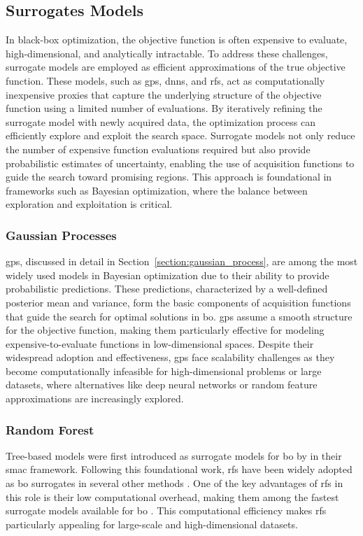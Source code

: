  
\subsection{Surrogates Models}
In black-box optimization, the objective function is often expensive to evaluate, high-dimensional, and analytically intractable. To address these challenges, surrogate models are employed as efficient approximations of the true objective function. These models, such as \acfp{gp}, \acfp{dnn}, and \acfp{rf}, act as computationally inexpensive proxies that capture the underlying structure of the objective function using a limited number of evaluations. By iteratively refining the surrogate model with newly acquired data, the optimization process can efficiently explore and exploit the search space. Surrogate models not only reduce the number of expensive function evaluations required but also provide probabilistic estimates of uncertainty, enabling the use of acquisition functions to guide the search toward promising regions. This approach is foundational in frameworks such as Bayesian optimization, where the balance between exploration and exploitation is critical.

\subsubsection{Gaussian Processes}

\acfp{gp}, discussed in detail in Section~\ref{section:gaussian_process}, are among the most widely used models in Bayesian optimization due to their ability to provide probabilistic predictions. These predictions, characterized by a well-defined posterior mean and variance, form the basic components of acquisition functions that guide the search for optimal solutions in \ac{bo}. \acp{gp} assume a smooth structure for the objective function, making them particularly effective for modeling expensive-to-evaluate functions in low-dimensional spaces. Despite their widespread adoption and effectiveness, \acp{gp} face scalability challenges as they become computationally infeasible for high-dimensional problems or large datasets, where alternatives like deep neural networks or random feature approximations are increasingly explored.

\subsubsection{Random Forest}
Tree-based models were first introduced as surrogate models for \ac{bo} by \citet{hutter2011sequential} in their \ac{smac} framework. Following this foundational work, \acfp{rf} have been widely adopted as \ac{bo} surrogates in several other methods \citep{feurer2015efficient, lindauer2022smac3}. One of the key advantages of \acp{rf} in this role is their low computational overhead, making them among the fastest surrogate models available for \ac{bo} \citep{kim2022uncertainty}. This computational efficiency makes \acp{rf} particularly appealing for large-scale and high-dimensional datasets. 

